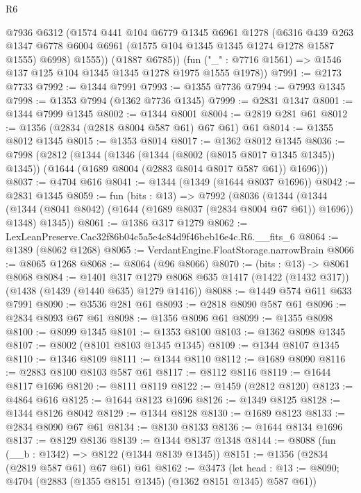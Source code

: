 \begin{lexlean}{R6}
\begin{coremodule}
          @7936
          @6312
          (@1574
            @441
            @104
            @6779
            @1345
            @6961
            @1278
            (@6316
              @439
              @263
              @1347
              @6778
              @6004
              @6961
              (@1575 @104 @1345 @1345 @1274 @1278 @1587 @1555)
              @6998)
            @1555))
        (@1887 @6785))
      (fun ("_" : @7716 @1561) => @1546 @137 @125 @104 @1345 @1345 @1278 @1975 @1555 @1978))
@7991 := @2173 @7733
@7992 := @1344 @7991
@7993 := @1355 @7736
@7994 := @7993 @1345
@7998 := @1353 @7994 (@1362 @7736 @1345)
@7999 := @2831 @1347
@8001 := @1344 @7999 @1345
@8002 := @1344 @8001
@8004 := @2819 @281 @61
@8012 := @1356 (@2834 (@2818 @8004 @587 @61) @67 @61) @61
@8014 := @1355 @8012 @1345
@8015 := @1353 @8014
@8017 := @1362 @8012 @1345
@8036 := @7998
    (@2812
      (@1344
        (@1346 (@1344 (@8002 (@8015 @8017 @1345 @1345)) @1345))
        (@1644 (@1689 @8004 (@2883 @8014 @8017 @587 @61)) @1696)))
@8037 := @4704 @616
@8041 := @1344 (@1349 (@1644 @8037 @1696))
@8042 := @2831 @1345
@8059 := fun (bits : @13) =>
  @7992
    (@8036
      (@1344
        (@1344 (@1344 (@8041 @8042) (@1644 (@1689 @8037 (@2834 @8004 @67 @61)) @1696)) @1348)
        @1345))
@8061 := @1386 @317 @1279
@8062 := LexLeanPreserve.Cac32f86b04c5a5e4c84d9f46beb16e4c.R6.__fits_6
@8064 := @1389 (@8062 @1268)
@8065 := VerdantEngine.FloatStorage.narrowBrain
@8066 := @8065 @1268
@8068 := @8064 (@96 @8066)
@8070 := (bits : @13) -> @8061 @8068
@8084 := @1401
    @317
    @1279
    @8068
    @635
    @1417
    (@1422 (@1432 @317))
    (@1438 (@1439 (@1440 @635) @1279 @1416))
@8088 := @1449 @574 @611 @633 @7991
@8090 := @3536 @281 @61
@8093 := @2818 @8090 @587 @61
@8096 := @2834 @8093 @67 @61
@8098 := @1356 @8096 @61
@8099 := @1355 @8098
@8100 := @8099 @1345
@8101 := @1353 @8100
@8103 := @1362 @8098 @1345
@8107 := @8002 (@8101 @8103 @1345 @1345)
@8109 := @1344 @8107 @1345
@8110 := @1346 @8109
@8111 := @1344 @8110
@8112 := @1689 @8090
@8116 := @2883 @8100 @8103 @587 @61
@8117 := @8112 @8116
@8119 := @1644 @8117 @1696
@8120 := @8111 @8119
@8122 := @1459 (@2812 @8120)
@8123 := @4864 @616
@8125 := @1644 @8123 @1696
@8126 := @1349 @8125
@8128 := @1344 @8126 @8042
@8129 := @1344 @8128
@8130 := @1689 @8123
@8133 := @2834 @8090 @67 @61
@8134 := @8130 @8133
@8136 := @1644 @8134 @1696
@8137 := @8129 @8136
@8139 := @1344 @8137 @1348
@8144 := @8088 (fun (__b : @1342) => @8122 (@1344 @8139 @1345))
@8151 := @1356 (@2834 (@2819 @587 @61) @67 @61) @61
@8162 := @3473
    (let head : @13 := @8090; @4704 (@2883 (@1355 @8151 @1345) (@1362 @8151 @1345) @587 @61))

\end{coremodule}
\end{lexlean}
